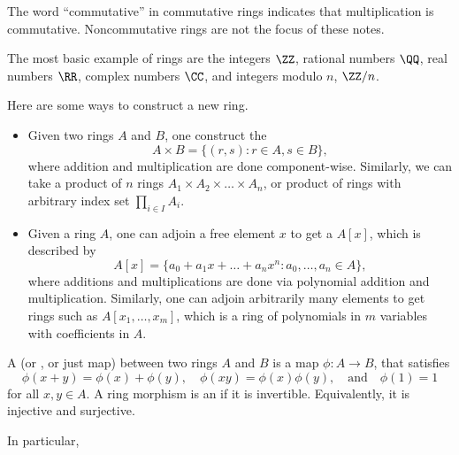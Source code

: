The word ``commutative'' in commutative rings 
indicates that multiplication is commutative.
Noncommutative rings are not the focus of these notes.
\begin{center}
\end{center}
\begin{example}
The most basic example of rings are the integers $\ZZ$,
rational numbers $\QQ$, real numbers $\RR$, complex numbers $\CC$,
and integers modulo $n$, $\ZZ/n$.
\end{example}
\begin{example}
\label{ex:construct_rings}
Here are some ways to construct a new ring.
\begin{itemize}
\item Given two rings $A$ and $B$, one construct 
the 
$$A\times B = \{(r,s) : r\in A, s\in B\},$$
where addition and multiplication are done component-wise.
Similarly, we can take a product of $n$ rings 
$A_1\times A_2\times\dots\times A_n$, or product of rings 
with arbitrary index set $\prod_{i\in I}A_i$.
\item Given a ring $A$, one can adjoin a free element $x$
to get a  $A[x]$, which is 
described by 
$$A[x] = \{a_0 + a_1x + \dots + a_nx^n : a_0,\dots,a_n\in A\},$$
where additions and multiplications are done via polynomial 
addition and multiplication.
Similarly, one can adjoin arbitrarily many elements 
to get rings such as $A[x_1,\dots,x_m]$, 
which is a ring of polynomials in $m$ variables
with coefficients in $A$.
\end{itemize}
\end{example}
\begin{definition}
A  (or , or just map) 
between two rings $A$ and $B$ is a map $\phi : A\to B$,
that satisfies 
$$\phi(x+y) = \phi(x)+\phi(y),\quad 
\phi(xy) = \phi(x)\phi(y),\quad\text{and}\quad 
\phi(1)=1$$ 
for all $x,y\in A$.
A ring morphism is an  if it is 
invertible. Equivalently, it is injective and surjective.
\end{definition}
In particular,
\begin{center}
\end{center}

